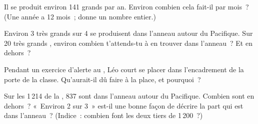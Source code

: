 \begin{exercise}[$\star\star$]\label{exo:g4:volcanoes-earthquakes-first-look:8}
Il se produit environ 141 grands  par an. Environ combien cela
fait-il par mois~? (Une année a 12 mois~; donne un nombre entier.)
\end{exercise}

\begin{exercise}[$\star\star$]\label{exo:g4:volcanoes-earthquakes-first-look:9}
Environ 3 très grands  sur 4 se produisent dans l'anneau autour du
Pacifique. Sur 20 très grands , environ combien t'attends-tu à en
trouver dans l'anneau~? Et en dehors~?
\end{exercise}

\begin{exercise}[$\star\star$]\label{exo:g4:volcanoes-earthquakes-first-look:10}
Pendant un exercice d'alerte au , Léo court se placer dans
l'encadrement de la porte de la classe. Qu'aurait-il dû faire à la place,
et pourquoi~?
\end{exercise}

\begin{exercise}[$\star\star\star$]\label{exo:g4:volcanoes-earthquakes-first-look:11}
Sur les 1\,214  de la , 837 sont dans l'anneau autour du
Pacifique. Combien sont en dehors~? «~Environ 2 sur 3~» est-il une bonne
façon de décrire la part qui est dans l'anneau~? (Indice~: combien font
les deux tiers de 1\,200~?)
\end{exercise}

